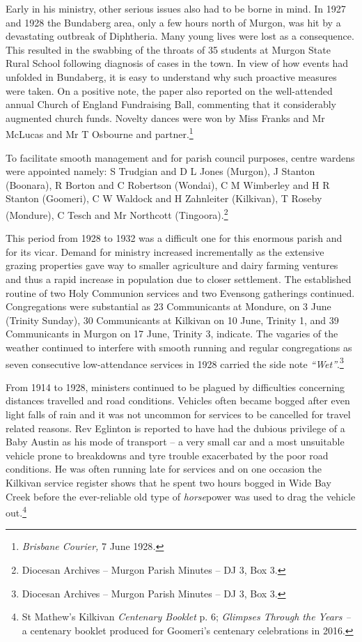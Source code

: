Early in his ministry, other serious issues also had to be borne in mind. In 1927 and 1928 the Bundaberg area, only a few hours north of Murgon, was hit by a devastating outbreak of Diphtheria. Many young lives were lost as a consequence. This resulted in the swabbing of the throats of 35 students at Murgon State Rural School following diagnosis of cases in the town. In view of how events had unfolded in Bundaberg, it is easy to understand why such proactive measures were taken. On a positive note, the paper also reported on the well-attended annual Church of England Fundraising Ball, commenting that it considerably augmented church funds. Novelty dances were won by Miss Franks and Mr McLucas and Mr T Osbourne and partner.\footnote{\emph{Brisbane Courier,} 7 June 1928\emph{.}}


To facilitate smooth management and for parish council purposes, centre wardens were appointed namely: S Trudgian and D L Jones (Murgon), J Stanton (Boonara), R Borton and C Robertson (Wondai), C M Wimberley and H R Stanton (Goomeri), C W Waldock and H Zahnleiter (Kilkivan), T Roseby (Mondure), C Tesch and Mr Northcott (Tingoora).\footnote{Diocesan Archives -- Murgon Parish Minutes -- DJ 3, Box 3.}


This period from 1928 to 1932 was a difficult one for this enormous parish and for its vicar. Demand for ministry increased incrementally as the extensive grazing properties gave way to smaller agriculture and dairy farming ventures and thus a rapid increase in population due to closer settlement. The established routine of two Holy Communion services and two Evensong gatherings continued. Congregations were substantial as 23 Communicants at Mondure, on 3 June (Trinity Sunday), 30 Communicants at Kilkivan on 10 June, Trinity 1, and 39 Communicants in Murgon on 17 June, Trinity 3, indicate. The vagaries of the weather continued to interfere with smooth running and regular congregations as seven consecutive low-attendance services in 1928 carried the side note \emph{``Wet''}.\footnote{Diocesan Archives -- Murgon Parish Minutes -- DJ 3, Box 3.}


From 1914 to 1928, ministers continued to be plagued by difficulties concerning distances travelled and road conditions. Vehicles often became bogged after even light falls of rain and it was not uncommon for services to be cancelled for travel related reasons. Rev Eglinton is reported to have had the dubious privilege of a Baby Austin as his mode of transport -- a very small car and a most unsuitable vehicle prone to breakdowns and tyre trouble exacerbated by the poor road conditions. He was often running late for services and on one occasion the Kilkivan service register shows that he spent two hours bogged in Wide Bay Creek before the ever-reliable old type of \emph{horse}power was used to drag the vehicle out.\footnote{St Mathew's Kilkivan \emph{Centenary Booklet} p. 6; \emph{Glimpses Through the Years --} a centenary booklet produced for Goomeri's centenary celebrations in 2016.}








